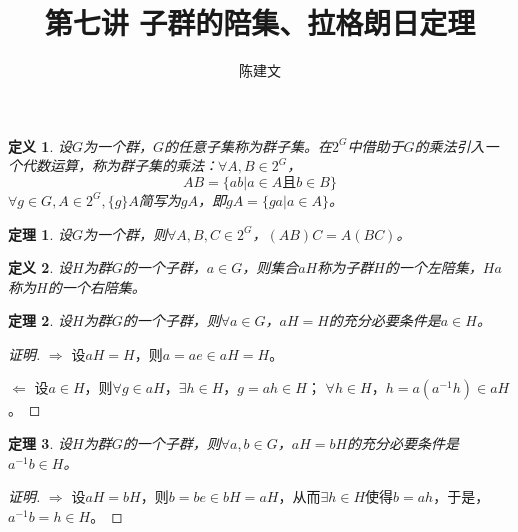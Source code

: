 \documentclass{article}
\newtheorem{Def}{定义}
\newtheorem{Thm}{定理}
\begin{document}
\begin{CJK*}{UTF8}{gbsn}
  \title{第七讲 子群的陪集、拉格朗日定理}
  \author{陈建文}
  \maketitle
  \begin{Def}
    设$G$为一个群，$G$的任意子集称为群子集。在$2^G$中借助于$G$的乘法引入一个代数运算，称为群子集的乘法：$\forall A,B\in 2^G$，
    \[AB=\{ab|a\in A \text{且} b\in B\}\]
    $\forall g\in G,A\in 2^G,\{g\}A$简写为$gA$，即$gA=\{ga|a\in A\}$。
  \end{Def}
  \begin{Thm}
    设$G$为一个群，则$\forall A,B,C\in 2^G$，$(AB)C=A(BC)$。
  \end{Thm}
\begin{Def}
  设$H$为群$G$的一个子群，$a\in G$，则集合$aH$称为子群$H$的一个左陪集，$Ha$称为$H$的一个右陪集。
\end{Def}

\begin{Thm}
  设$H$为群$G$的一个子群，则$\forall a\in G$，$aH=H$的充分必要条件是$a\in H$。
\end{Thm}
\begin{proof}[证明]
$\Rightarrow$
设$aH=H$，则$a=ae\in aH=H$。

$\Leftarrow$
设$a\in H$，则$\forall g\in aH$，$\exists h\in H$，$g=ah\in H$；
$\forall h\in H$，$h=a(a^{-1}h)\in aH$。
\end{proof}
\begin{Thm}
  设$H$为群$G$的一个子群，则$\forall a,b\in G$，$aH=bH$的充分必要条件是$a^{-1}b\in H$。
\end{Thm}
\begin{proof}[证明]
  $\Rightarrow$
  设$aH=bH$，则$b=be\in bH=aH$，从而$\exists h\in H$使得$b=ah$，于是，$a^{-1}b=h\in H$。


\end{proof}
\end{CJK*}
\end{document}
